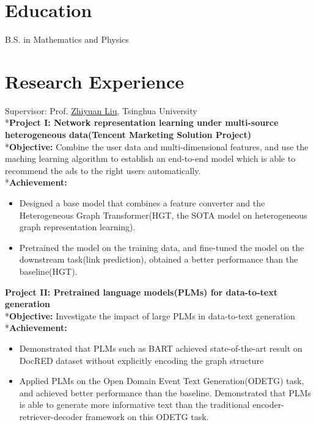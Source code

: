 \documentclass{resume}
\begin{document}



\section{Education}
B.S. in Mathematics and Physics


\section{Research Experience}
Supervisor: Prof. \href{http://nlp.csai.tsinghua.edu.cn/~lzy/}{Zhiyuan Liu}, Tsinghua University
\\*\textbf{Project I: Network representation learning under multi-source heterogeneous data(Tencent Marketing Solution Project)}
\\*\textbf{Objective:} Combine the user data and multi-dimensional features, and use the maching learning algorithm to establish an end-to-end model which is able to recommend the ads to the right users automatically. 
\\*\textbf{Achievement:}
\begin{itemize}
  \item Designed a base model that combines a feature converter and the Heterogeneous Graph Transformer(HGT, the SOTA model on heterogeneous graph representation learning). 
  \item Pretrained the model on the training data, and fine-tuned the model on the downstream task(link prediction), obtained a better performance than the baseline(HGT).
\end{itemize}

\textbf{Project II: Pretrained language models(PLMs) for data-to-text generation}
\\*\textbf{Objective:} Investigate the impact of large PLMs in data-to-text generation
\\*\textbf{Achievement:}
\begin{itemize}
  \item Demonstrated that PLMs such as BART achieved state-of-the-art result on DocRED dataset without explicitly encoding the graph structure
  \item Applied PLMs on the Open Domain Event Text Generation(ODETG) task, and achieved better performance than the baseline. Demonstrated that PLMs is able to generate more informative text than the traditional encoder-retriever-decoder framework on this ODETG task.
\end{itemize}
\end{document}
